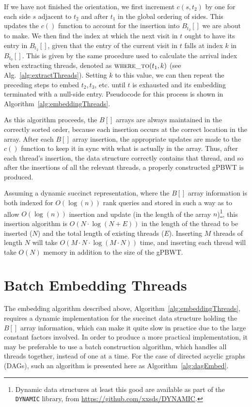 If we have not finished the orientation, we first increment $c(s, t_2)$ by one for each side $s$ adjacent to $t_2$ and after $t_1$ in the global ordering of sides. This updates the $c()$ function to account for the insertion into $B_{t_2}[]$ we are about to make.
We then find the index at which the next visit in $t$ ought to have its entry in $B_{t_{2}}[]$, given that the entry of the current visit in $t$ falls at index $k$ in $B_{t_{0}}[]$. This is given by the same procedure used to calculate the arrival index when extracting threads, denoted as $\Call{where\_to}{t_1, k}$ (see Alg.~\ref{alg:extractThreads}). Setting $k$ to this value, we can then repeat the preceding steps to embed $t_2, t_3$, etc. until $t$ is exhausted and its embedding terminated with a null-side entry. Pseudocode for this process is shown in Algorithm~\ref{alg:embeddingThreads}.

As this algorithm proceeds, the $B[]$ arrays are always maintained in the correctly sorted order, because each insertion occurs at the correct location in the array. After each $B[]$ array insertion, the appropriate updates are made to the $c()$ function to keep it in sync with what is actually in the array. Thus, after each thread's insertion, the data structure correctly contains that thread, and so after the insertions of all the relevant threads, a properly constructed gPBWT is produced.

Assuming a dynamic succinct representation, where the $B[]$ array information is both indexed for $O(\log(n))$ rank queries and stored in such a way as to allow $O(\log(n))$ insertion and update (in the length of the array $n$)\footnote{Dynamic data structures at least this good are available as part of the \texttt{DYNAMIC} library, from \url{https://github.com/xxsds/DYNAMIC}.}, this insertion algorithm is $O(N \cdot \log(N + E))$ in the length of the thread to be inserted ($N$) and the total length of existing threads ($E$). Inserting $M$ threads of length $N$ will take $O(M \cdot N \cdot \log(M \cdot N))$ time, and inserting each thread will take $O(N)$ memory in addition to the size of the gPBWT.

\section{Batch Embedding Threads}

The embedding algorithm described above, Algorithm~\ref{alg:embeddingThreads}, requires a dynamic implementation for the succinct data structure holding the $B[]$ array information, which can make it quite slow in practice due to the large constant factors involved. In order to produce a more practical implementation, it may be preferable to use a batch construction algorithm, which handles all threads together, instead of one at a time. For the case of directed acyclic graphs (DAGs), such an algorithm is presented here as Algorithm~\ref{alg:dagEmbed}.

